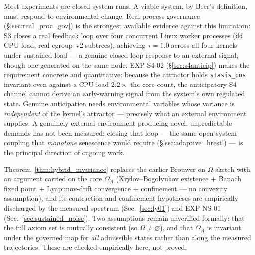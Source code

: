\documentclass[11pt, a4paper]{article}
\begin{document}
\begin{description}[itemsep=0.55em]
  \item[No external environment]
    Most experiments are closed-system runs.
    A viable system, by Beer's definition, must respond to environmental
    change.
    Real-process governance (\S\ref{sec:real_proc_gov}) is the strongest available
    evidence against this limitation: S3 closes a real feedback loop over four
    concurrent Linux worker processes (\texttt{dd} CPU load, real cgroup~v2 subtrees),
    achieving $\tau = 1.0$ across all four kernels under sustained load ---
    a genuine closed-loop response to an external signal, though one generated
    on the same node.
    EXP-S4-02 (\S\ref{sec:s4anticip}) makes the requirement concrete and
    quantitative: because the attractor holds \texttt{stasis\_cos} invariant even
    against a CPU load $2.2\times$ the core count, the anticipatory S4 channel
    cannot derive an early-warning signal from the system's own regulated state.
    Genuine anticipation needs environmental variables whose variance is
    \emph{independent} of the kernel's attractor --- precisely what an external
    environment supplies.
    A genuinely external environment producing novel, unpredictable demands
    has not been measured; closing that loop --- the same open-system coupling
    that \emph{monotone} senescence would require (\S\ref{sec:adaptive_hrest})
    --- is the principal direction of ongoing work.

  \item[Existence argument: residual assumptions]
    Theorem~\ref{thm:hybrid_invariance} replaces the earlier Brouwer-on-$\Omega$
    sketch with an argument carried on the core $\Omega_A$
    (Krylov--Bogolyubov existence + Banach fixed point + Lyapunov-drift
    convergence + confinement --- no convexity assumption),
    and its contraction and confinement hypotheses are empirically discharged by
    the measured spectrum (Sec.~\ref{sec:ly01}) and EXP-NS-01
    (Sec.~\ref{sec:sustained_noise}). Two assumptions remain unverified formally:
    that the full axiom set is mutually consistent (so $\Omega \neq \varnothing$),
    and that $\Omega_A$ is invariant under the governed map for \emph{all} admissible
    states rather than along the measured trajectories. These are checked
    empirically here, not proved.


\end{description}
\end{document}
